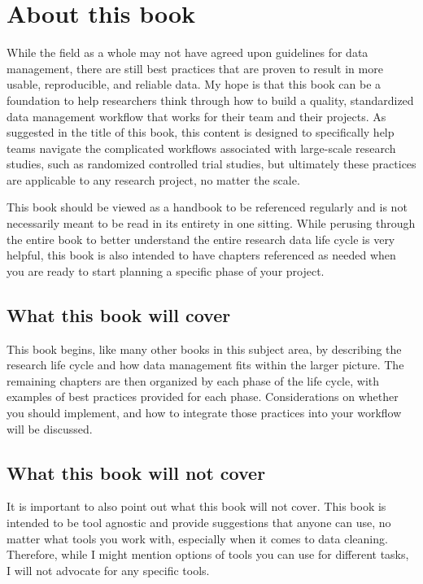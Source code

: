 \documentclass[
]{book}
\begin{document}
\hypertarget{about-this-book}{%
\section{About this book}\label{about-this-book}}

While the field as a whole may not have agreed upon guidelines for data management, there are still best practices that are proven to result in more usable, reproducible, and reliable data. My hope is that this book can be a foundation to help researchers think through how to build a quality, standardized data management workflow that works for their team and their projects. As suggested in the title of this book, this content is designed to specifically help teams navigate the complicated workflows associated with large-scale research studies, such as randomized controlled trial studies, but ultimately these practices are applicable to any research project, no matter the scale.

This book should be viewed as a handbook to be referenced regularly and is not necessarily meant to be read in its entirety in one sitting. While perusing through the entire book to better understand the entire research data life cycle is very helpful, this book is also intended to have chapters referenced as needed when you are ready to start planning a specific phase of your project.

\hypertarget{what-this-book-will-cover}{%
\subsection{What this book will cover}\label{what-this-book-will-cover}}

This book begins, like many other books in this subject area, by describing the research life cycle and how data management fits within the larger picture. The remaining chapters are then organized by each phase of the life cycle, with examples of best practices provided for each phase. Considerations on whether you should implement, and how to integrate those practices into your workflow will be discussed.

\hypertarget{what-this-book-will-not-cover}{%
\subsection{What this book will not cover}\label{what-this-book-will-not-cover}}

It is important to also point out what this book will not cover. This book is intended to be tool agnostic and provide suggestions that anyone can use, no matter what tools you work with, especially when it comes to data cleaning. Therefore, while I might mention options of tools you can use for different tasks, I will not advocate for any specific tools.
\end{document}

